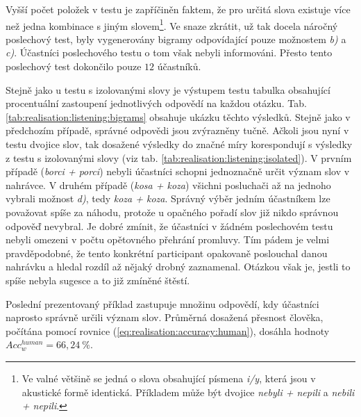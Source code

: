 Vyšší počet položek v testu je zapříčiněn faktem, že pro určitá slova existuje více než jedna kombinace s jiným slovem\footnote{Ve valné většině se jedná o slova obsahující písmena \textit{i/y}, která jsou v akustické formě identická. Příkladem může být dvojice \textit{nebyli + nepili} a \textit{nebili + nepili}.}. Ve snaze zkrátit, už tak docela náročný poslechový test, byly vygenerovány bigramy odpovídající pouze možnostem \textit{b)} a \textit{c)}. Účastníci poslechového testu o tom však nebyli informováni. Přesto tento poslechový test dokončilo pouze $12$ účastníků.

Stejně jako u testu s izolovanými slovy je výstupem testu tabulka obsahující procentuální zastoupení jednotlivých odpovědí na každou otázku. Tab. \ref{tab:realisation:listening:bigrams} obsahuje ukázku těchto výsledků. Stejně jako v předchozím případě, správné odpovědi jsou zvýrazněny tučně. Ačkoli jsou nyní v testu dvojice slov, tak dosažené výsledky do značné míry korespondují s výsledky z testu s izolovanými slovy (viz tab. \ref{tab:realisation:listening:isolated}). V prvním případě (\textit{borci + porci}) nebyli účastníci schopni jednoznačně určit význam slov v nahrávce. V druhém případě (\textit{kosa + koza}) všichni posluchači až na jednoho vybrali možnost \textit{d)}, tedy \textit{koza + koza}. Správný výběr jedním účastníkem lze považovat spíše za náhodu, protože u opačného pořadí slov již nikdo správnou odpověď nevybral. Je dobré zmínit, že účastníci v žádném poslechovém testu nebyli omezeni v počtu opětovného přehrání promluvy. Tím pádem je velmi pravděpodobné, že tento konkrétní participant opakovaně poslouchal danou nahrávku a hledal rozdíl až nějaký drobný zaznamenal. Otázkou však je, jestli to spíše nebyla sugesce a to již zmíněné štěstí.

Poslední prezentovaný příklad zastupuje množinu odpovědí, kdy účastníci naprosto správně určili význam slov. Průměrná dosažená přesnost člověka, počítána pomocí rovnice (\ref{eq:realisation:accuracy:human}), dosáhla hodnoty $Acc_{w}^{human} = 66,24\ \%$.

